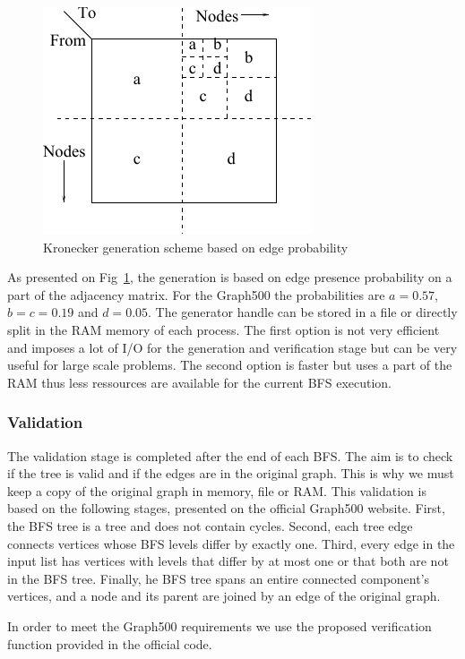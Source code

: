 \begin{figure}[!t]
	\centering
	\includegraphics[scale=.9]{figures/graph500/rmat_generation}
	\caption{Kronecker generation scheme based on edge probability}
	\label{fig:kron_gen_scheme}
\end{figure}

As presented on Fig~\ref{fig:kron_gen_scheme}, the generation is based on edge presence probability on a part of the adjacency matrix. 
For the Graph500 the probabilities are $a = 0.57$, $b = c = 0.19$ and $d = 0.05$.
The generator handle can be stored in a file or directly split in the RAM memory of each process. 
The first option is not very efficient and imposes a lot of I/O for the generation and verification stage but can be very useful for large scale problems.
The second option is faster but uses a part of the RAM thus less ressources are available for the current BFS execution.


\subsubsection{Validation}
The validation stage is completed after the end of each BFS. 
The aim is to check if the tree is valid and if the edges are in the original graph.
 This is why we must keep a copy of the original graph in memory, file or RAM. 
This validation is based on the following stages, presented on the official Graph500 website.
First, the BFS tree is a tree and does not contain cycles.
Second, each tree edge connects vertices whose BFS levels differ by exactly one.
Third, every edge in the input list has vertices with levels that differ by at most one or that both are not in the BFS tree.
Finally, he BFS tree spans an entire connected component's vertices, and
a node and its parent are joined by an edge of the original graph.

In order to meet the Graph500 requirements we use the proposed verification function provided in the official code.

